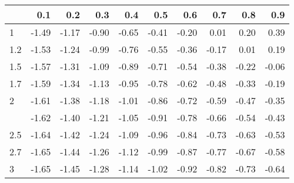 
\begin{tabular}{lrrrrrrrrr}
\toprule
  & 0.1 & 0.2 & 0.3 & 0.4 & 0.5 & 0.6 & 0.7 & 0.8 & 0.9\\
\midrule
1 & -1.49 & -1.17 & -0.90 & -0.65 & -0.41 & -0.20 & 0.01 & 0.20 & 0.39\\
1.2 & -1.53 & -1.24 & -0.99 & -0.76 & -0.55 & -0.36 & -0.17 & 0.01 & 0.19\\
1.5 & -1.57 & -1.31 & -1.09 & -0.89 & -0.71 & -0.54 & -0.38 & -0.22 & -0.06\\
1.7 & -1.59 & -1.34 & -1.13 & -0.95 & -0.78 & -0.62 & -0.48 & -0.33 & -0.19\\
2 & -1.61 & -1.38 & -1.18 & -1.01 & -0.86 & -0.72 & -0.59 & -0.47 & -0.35\\
\addlinespace
2.2 & -1.62 & -1.40 & -1.21 & -1.05 & -0.91 & -0.78 & -0.66 & -0.54 & -0.43\\
2.5 & -1.64 & -1.42 & -1.24 & -1.09 & -0.96 & -0.84 & -0.73 & -0.63 & -0.53\\
2.7 & -1.65 & -1.44 & -1.26 & -1.12 & -0.99 & -0.87 & -0.77 & -0.67 & -0.58\\
3 & -1.65 & -1.45 & -1.28 & -1.14 & -1.02 & -0.92 & -0.82 & -0.73 & -0.64\\
\bottomrule
\end{tabular}
